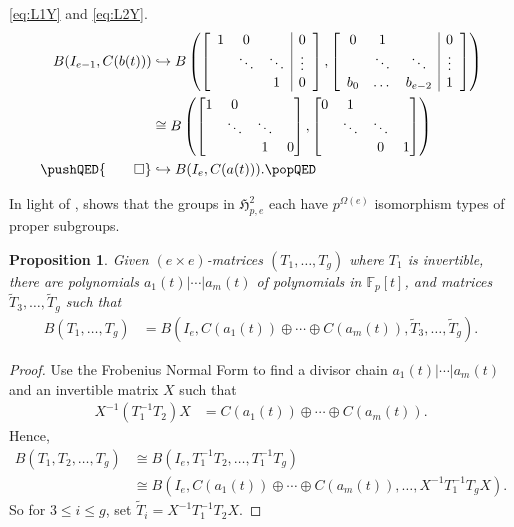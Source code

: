 \documentclass{toc}
\numberwithin{equation}{section}
\theoremstyle{plain}       %
\newtheorem{prop}[equation]{Proposition}
\theoremstyle{remark}
\theoremstyle{definition}
\numberwithin{figure}{section}
\numberwithin{table}{section}
\newcommand{\mygroups}{\mathfrak{H}}
\newcommand{\bbF}{\mathbb{F}}  %
\begin{document}
\eqref{eq:L1Y} and \eqref{eq:L2Y}.
\begin{align*}
	B(I_{e-1}, C(b(t))) & \hookrightarrow
	 B\left(\left[\begin{array}{ccc|c} 1 & 0 & & 0 \\ & \ddots & \ddots &\vdots \\ & & 1& 0\end{array}\right],
	\left[\begin{array}{ccc|c} 0 & 1 & & 0 \\ & \ddots & \ddots & \vdots\\ b_0 &\dots & b_{e-2} & 1\end{array}\right]\right)\\
	&\cong B\left(\begin{bmatrix} 1 & 0 & & \\ & \ddots & \ddots \\ & & 1 & 0 \end{bmatrix},
	\begin{bmatrix} 0 & 1 & & \\ & \ddots & \ddots \\ & & 0 & 1 \end{bmatrix}\right)\\
	\pushQED{\qed} 
	& \hookrightarrow B(I_e, C(a(t))).\qedhere
	\popQED
\end{align*}
%

\begin{remark}
In light of ,  shows that the
groups in $\mygroups_{p,e}^{2}$ each have  $p^{\Omega(e)}$ isomorphism types of
proper subgroups.
\end{remark}

\begin{prop}\label{prop:pairs}
	Given $(e\times e)$-matrices $(T_1,\dots,T_g)$ where $T_1$ is invertible,
	there are polynomials $a_1(t)|\cdots |a_m(t)$ of polynomials in $\bbF_p[t]$,
	and matrices $\tilde{T}_3,\dots,\tilde{T}_g$ such that
\begin{align*}
	B(T_1,\ldots,T_g) & = B(I_e, C(a_1(t))\oplus \cdots \oplus C(a_m(t)), 
		\tilde{T}_3,\dots,\tilde{T}_g).
\end{align*}
\end{prop}
\begin{proof}
Use the Frobenius Normal Form \cite[p. 93]{JacII} to find a divisor chain
$a_1(t)|\cdots |a_m(t)$ and an invertible matrix $X$ such that 
\begin{align*}
	X^{-1}(T_1^{-1}T_2)X& = C(a_1(t))\oplus \cdots \oplus C(a_m(t)).
\end{align*}
Hence,
\begin{align*}
	B(T_1,T_2,\dots,T_g) & \cong 
		B(I_e,T_1^{-1}T_2,\dots,T_1^{-1}T_g) \\
		& \cong B(I_e,C(a_1(t))\oplus \cdots \oplus C(a_m(t)),\dots, 
			X^{-1}T_1^{-1}T_g X).
\end{align*}
So for $3\leq i\leq g$, set $\tilde{T}_i=X^{-1} T_1^{-1}T_2 X$.
\end{proof}
\end{document}
